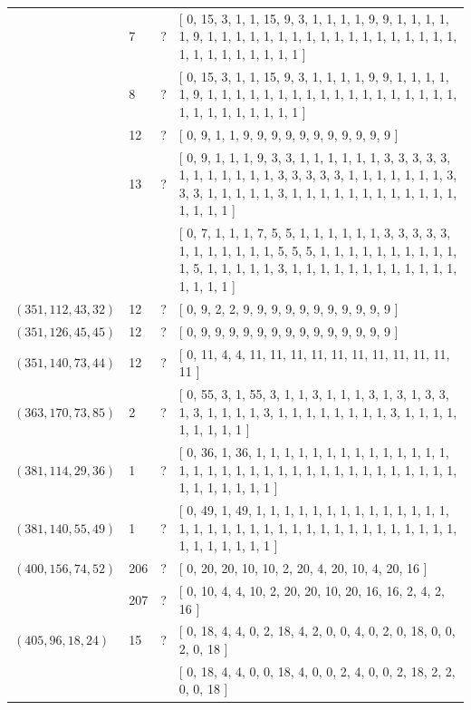 \documentclass[12pt]{amsproc} %
\theoremstyle{definition}\newtheorem{defn}[thm]{Definition}
\theoremstyle{definition}\newtheorem{rem}[thm]{Remark}
\theoremstyle{definition}\newtheorem{ex}[thm]{Example}
\begin{document}
\begin{center}
\begin{longtable}{p{3.66cm}|P{0.8cm}|P{0.69cm}|p{10cm}}
		   & 7 & ? & [ 0, 15, 3, 1, 1, 15, 9, 3, 1, 1, 1, 1, 9, 9, 1, 1, 1, 1, 1, 9, 1, 1, 1, 1, 1, 1, 1, 1, 1, 1, 1, 1, 1, 1, 1, 1, 1, 1, 1, 1, 1, 1, 1, 1, 1, 1, 1 ] \\
		   & 8 & ? & [ 0, 15, 3, 1, 1, 15, 9, 3, 1, 1, 1, 1, 9, 9, 1, 1, 1, 1, 1, 9, 1, 1, 1, 1, 1, 1, 1, 1, 1, 1, 1, 1, 1, 1, 1, 1, 1, 1, 1, 1, 1, 1, 1, 1, 1, 1, 1 ] \\
		   & 12 & ? & [ 0, 9, 1, 1, 9, 9, 9, 9, 9, 9, 9, 9, 9, 9, 9 ] \\
		   & 13 & ? & [ 0, 9, 1, 1, 1, 9, 3, 3, 1, 1, 1, 1, 1, 1, 3, 3, 3, 3, 3, 1, 1, 1, 1, 1, 1, 1, 3, 3, 3, 3, 3, 1, 1, 1, 1, 1, 1, 1, 3, 3, 3, 1, 1, 1, 1, 1, 3, 1, 1, 1, 1, 1, 1, 1, 1, 1, 1, 1, 1, 1, 1, 1, 1 ] \\
		   &  &  & [ 0, 7, 1, 1, 1, 7, 5, 5, 1, 1, 1, 1, 1, 1, 3, 3, 3, 3, 3, 1, 1, 1, 1, 1, 1, 1, 5, 5, 5, 1, 1, 1, 1, 1, 1, 1, 1, 1, 1, 1, 5, 1, 1, 1, 1, 1, 3, 1, 1, 1, 1, 1, 1, 1, 1, 1, 1, 1, 1, 1, 1, 1, 1 ] \\
		\hline
		 $(351, 112, 43, 32)$  & 12 & ? & [ 0, 9, 2, 2, 9, 9, 9, 9, 9, 9, 9, 9, 9, 9, 9 ] \\
		\hline
		 $(351, 126, 45, 45)$  & 12 & ? & [ 0, 9, 9, 9, 9, 9, 9, 9, 9, 9, 9, 9, 9, 9, 9 ] \\
		\hline
		 $(351, 140, 73, 44)$  & 12 & ? & [ 0, 11, 4, 4, 11, 11, 11, 11, 11, 11, 11, 11, 11, 11, 11 ] \\
		\hline
		 $(363, 170, 73, 85)$  & 2 & ? & [ 0, 55, 3, 1, 55, 3, 1, 1, 3, 1, 1, 1, 3, 1, 3, 1, 3, 3, 1, 3, 1, 1, 1, 1, 3, 1, 1, 1, 1, 1, 1, 1, 1, 3, 1, 1, 1, 1, 1, 1, 1, 1, 1 ] \\
		\hline
		 $(381, 114, 29, 36)$  & 1 & ? & [ 0, 36, 1, 36, 1, 1, 1, 1, 1, 1, 1, 1, 1, 1, 1, 1, 1, 1, 1, 1, 1, 1, 1, 1, 1, 1, 1, 1, 1, 1, 1, 1, 1, 1, 1, 1, 1, 1, 1, 1, 1, 1, 1, 1, 1 ] \\
		\hline
		 $(381, 140, 55, 49)$  & 1 & ? & [ 0, 49, 1, 49, 1, 1, 1, 1, 1, 1, 1, 1, 1, 1, 1, 1, 1, 1, 1, 1, 1, 1, 1, 1, 1, 1, 1, 1, 1, 1, 1, 1, 1, 1, 1, 1, 1, 1, 1, 1, 1, 1, 1, 1, 1 ] \\
		\hline
		 $(400, 156, 74, 52)$  & 206 & ? & [ 0, 20, 20, 10, 10, 2, 20, 4, 20, 10, 4, 20, 16 ] \\
		   & 207 & ? & [ 0, 10, 4, 4, 10, 2, 20, 20, 10, 20, 16, 16, 2, 4, 2, 16 ] \\
		\hline
		 $(405, 96, 18, 24)$  & 15 & ? & [ 0, 18, 4, 4, 0, 2, 18, 4, 2, 0, 0, 4, 0, 2, 0, 18, 0, 0, 2, 0, 18 ] \\
		   &  &  & [ 0, 18, 4, 4, 0, 0, 18, 4, 0, 0, 2, 4, 0, 0, 2, 18, 2, 2, 0, 0, 18 ] \\

\end{longtable}
\end{center}
\end{document}
